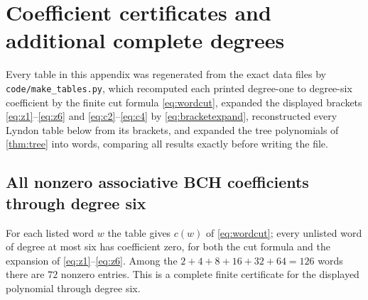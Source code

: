 \section{Coefficient certificates and additional complete degrees}\label{app:tables}
Every table in this appendix was regenerated from the exact data files by
\texttt{code/make\_tables.py}, which recomputed each printed degree-one to
degree-six coefficient by the finite cut formula \eqref{eq:wordcut}, expanded
the displayed brackets \eqref{eq:z1}--\eqref{eq:z6} and
\eqref{eq:c2}--\eqref{eq:c4} by \eqref{eq:bracketexpand}, reconstructed every
Lyndon table below from its brackets, and expanded the tree polynomials of
\cref{thm:tree} into words, comparing all results exactly before writing
the file.

\subsection{All nonzero associative BCH coefficients through degree six}
For each listed word $w$ the table gives $c(w)$ of \eqref{eq:wordcut}; every
unlisted word of degree at most six has coefficient zero, for both the cut
formula and the expansion of \eqref{eq:z1}--\eqref{eq:z6}. Among the
$2+4+8+16+32+64=126$ words there are $72$ nonzero entries. This is a complete
finite certificate for the displayed polynomial through degree six.
\begingroup\small
